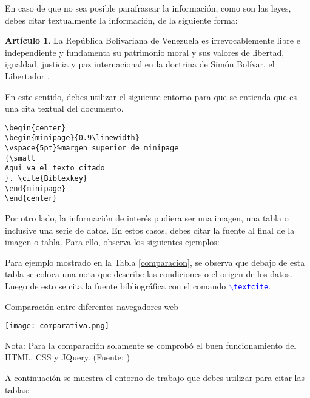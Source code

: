 En caso de que no sea posible parafrasear la información, como son las leyes, debes citar textualmente la información, de la siguiente forma:

\begin{center}
\begin{minipage}{0.9\linewidth}
\vspace{5pt}%
{\small
\textbf{Artículo 1}. La República Bolivariana de Venezuela es irrevocablemente libre e independiente y fundamenta su patrimonio moral y sus valores de libertad, igualdad, justicia y paz internacional en la doctrina de Simón Bolívar, el Libertador
}. \cite{28067}
\end{minipage}
\end{center}

En este sentido, debes utilizar el siguiente entorno para que se entienda que es una cita textual del documento.

\begin{lstlisting}[frame=single, float=ht]
\begin{center}
\begin{minipage}{0.9\linewidth}
\vspace{5pt}%margen superior de minipage
{\small
Aqui va el texto citado
}. \cite{Bibtexkey}
\end{minipage}
\end{center}
\end{lstlisting}

Por otro lado, la información de interés pudiera ser una imagen, una tabla o inclusive una serie de datos. En estos casos, debes citar la fuente al final de la imagen o tabla. Para ello, observa los siguientes ejemplos:

Para ejemplo mostrado en la Tabla \ref{comparacion}, se observa que debajo de esta tabla se coloca una nota que describe las condiciones o el origen de los datos. Luego de esto se cita la fuente bibliográfica con el comando \textcolor{blue}{$\backslash$\texttt{textcite}}. 

\begin{table}[H]
\caption{Comparación entre diferentes navegadores web}
\label{comparacion}
\centering
\texttt{[image: comparativa.png]}
\caption*{Nota: Para la comparación solamente se comprobó el buen funcionamiento del HTML, CSS y JQuery. (Fuente: \textcite{cobo_2011})}
\end{table}

A continuación se muestra el entorno de trabajo que debes utilizar para citar las tablas:

